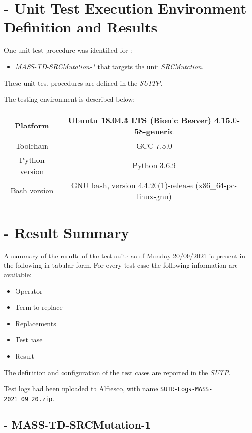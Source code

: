 
\chapter{\MASS - Unit Test Execution Environment Definition and Results}

One unit test procedure was identified for \MASS:
\begin{itemize}
  \item {\emph{MASS-TD-SRCMutation-1}} that targets the unit \emph{SRCMutation}.
\end{itemize}

These unit test procedures are defined in the \emph{SUITP}.

The testing environment is described below:

\begin{center}
\begin{tabular}{ |c|c| }
 \hline
 Platform & Ubuntu 18.04.3 LTS (Bionic Beaver) 4.15.0-58-generic \\
 \hline
 Toolchain & GCC 7.5.0 \\
 \hline
 Python version & Python 3.6.9 \\
 \hline
 Bash version & GNU bash, version 4.4.20(1)-release (x86\_64-pc-linux-gnu) \\
 \hline
\end{tabular}
\end{center}


\chapter{\MASS - Result Summary}

A summary of the results of the test suite as of Monday 20/09/2021 is present in the following in tabular form.
For every test case the following information are available:
\begin{itemize}
  \item Operator
  \item Term to replace
  \item Replacements
  \item Test case
  \item Result
\end{itemize}

The definition and configuration of the test cases are reported in the \emph{SUTP}.

Test logs had been uploaded to Alfresco, with name \texttt{SUTR-Logs-MASS-2021\_09\_20.zip}.

\section{\MASS - MASS-TD-SRCMutation-1}



\clearpage
